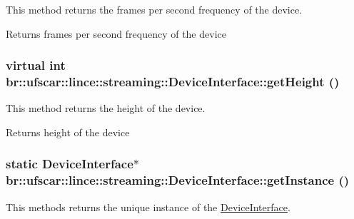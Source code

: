 This method returns the frames per second frequency of the device. 

\begin{DoxyReturn}{Returns}
frames per second frequency of the device 
\end{DoxyReturn}
\hypertarget{classbr_1_1ufscar_1_1lince_1_1streaming_1_1DeviceInterface_a70b3166ea9f6a5e5e531aa9456ce7b6c}{
\subsubsection[{getHeight}]{\setlength{\rightskip}{0pt plus 5cm}virtual int br::ufscar::lince::streaming::DeviceInterface::getHeight ()}}
\label{classbr_1_1ufscar_1_1lince_1_1streaming_1_1DeviceInterface_a70b3166ea9f6a5e5e531aa9456ce7b6c}


This method returns the height of the device. 

\begin{DoxyReturn}{Returns}
height of the device 
\end{DoxyReturn}
\hypertarget{classbr_1_1ufscar_1_1lince_1_1streaming_1_1DeviceInterface_a71372a3264033df2716d0300f54d4618}{
\subsubsection[{getInstance}]{\setlength{\rightskip}{0pt plus 5cm}static {\bf DeviceInterface}$\ast$ br::ufscar::lince::streaming::DeviceInterface::getInstance ()}}
\label{classbr_1_1ufscar_1_1lince_1_1streaming_1_1DeviceInterface_a71372a3264033df2716d0300f54d4618}


This methods returns the unique instance of the \hyperlink{classbr_1_1ufscar_1_1lince_1_1streaming_1_1DeviceInterface}{DeviceInterface}. 

